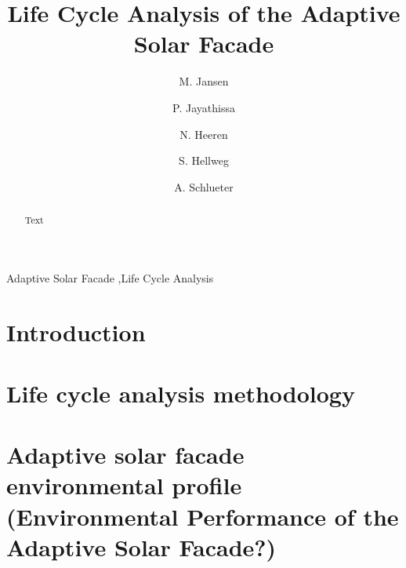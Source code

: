 \documentclass[preprint,12pt]{elsarticle}
\begin{document}
\begin{frontmatter}

\title{Life Cycle Analysis of the Adaptive Solar Facade} 

\author[ita]{M. Jansen}

\author[ita]{P. Jayathissa}

\author[baug]{N. Heeren}

\author[baug]{S. Hellweg}

\author[ita]{A. Schlueter}



\address[ita]{Architecture and Building Systems, Institute of Technology in Architecture,\\ ETH Zurich, Switzerland} 
\address[baug]{Ecological System Design, Institute of Environmental Engineering,\\ ETH Zurich, Switzerland}

\begin{abstract}
Text 
\end{abstract}

\begin{keyword}
Adaptive Solar Facade \sep Life Cycle Analysis
\end{keyword}

\end{frontmatter}

\section{Introduction}
\label{ch:introduction}


\section{Life cycle analysis methodology}
\label{ch:method}


\section{Adaptive solar facade environmental profile (Environmental Performance of the Adaptive Solar Facade?)}
\label{ch:profile}

\end{document}
